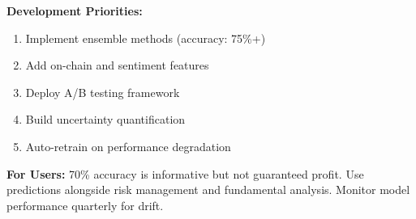 \textbf{Development Priorities:}
\begin{enumerate}
    \item Implement ensemble methods (accuracy: 75\%+)
    \item Add on-chain and sentiment features
    \item Deploy A/B testing framework
    \item Build uncertainty quantification
    \item Auto-retrain on performance degradation
\end{enumerate}

\textbf{For Users:}
70\% accuracy is informative but not guaranteed profit. Use predictions alongside risk management and fundamental analysis. Monitor model performance quarterly for drift.
